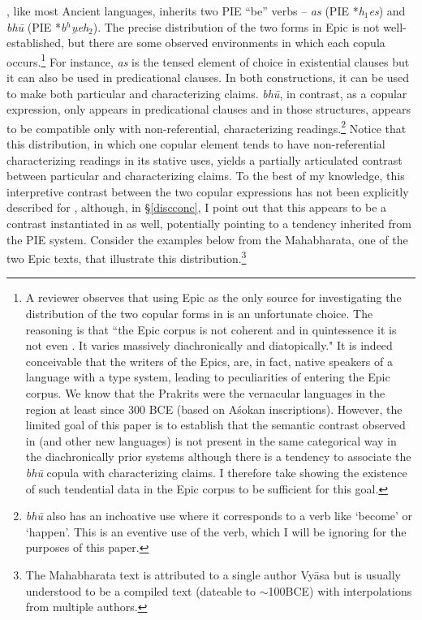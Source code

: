 \documentclass[output=paper,hidelinks]{langscibook}
\begin{document}
\begin{exe}
\begin{xlist}
\begin{xlist}
\begin{exe}
\begin{exe}
\begin{exe}
, like most Ancient  languages, inherits two PIE ``be'' verbs -- \emph{as} (PIE *\emph{h$_1$es}) and \emph{bh\={u}} (PIE *\emph{b$^{h}$u̯eh$_2$}). The precise distribution of the two forms in Epic  is not well-established, but there are some observed environments in which each copula occurs.\footnote{A reviewer observes that using Epic  as the only source for investigating the distribution of the two copular forms in  is an unfortunate choice. The reasoning is that ``the Epic
 corpus is not coherent and in quintessence it is not even . It varies
massively diachronically and diatopically." It is indeed conceivable that the writers of the  Epics, are, in fact, native speakers of a language with a  type system, leading to peculiarities of  entering the Epic corpus. We know that the  Prakrits were the vernacular languages in the region at least since 300 BCE (based on A\'{s}okan inscriptions). However, the limited goal of this paper is to establish that the semantic contrast observed in  (and other new  languages) is not present in the same categorical way in the diachronically prior systems although there is a tendency to associate the \emph{bh\={u}} copula with characterizing claims. I therefore take showing the existence of such tendential data in the Epic corpus to be sufficient for this goal.} For instance, \textit{as} is the tensed element of choice in existential clauses but it can also be used in predicational clauses. In both constructions, it can be used to make both particular and characterizing claims. \emph{bh\={u}}, in contrast, as a copular expression, only appears in predicational clauses and in those structures, appears to be compatible only with non-referential, characterizing readings.\footnote{\emph{bh\={u}} also has an inchoative use where it corresponds to a verb like `become' or `happen'. This is an eventive use of the verb, which I will be ignoring for the purposes of this paper.} Notice that this distribution, in which one copular element tends to have non-referential characterizing readings in its stative uses, yields a partially articulated contrast between particular and characterizing claims. To the best of my knowledge, this interpretive contrast between the two copular expressions has not been explicitly described for , although, in \S\ref{discconc}, I point out that this appears to be a contrast instantiated in  as well, potentially pointing to a tendency inherited from the PIE system.
Consider the examples below from the Mahabharata, one of the two Epic  texts, that illustrate this distribution.\footnote{The Mahabharata text is attributed to a single author Vyāsa but is usually understood to be a compiled text (dateable to $\sim$100BCE) with interpolations from multiple authors.}


\end{exe}
\end{exe}
\end{exe}
\end{xlist}
\end{xlist}
\end{exe}
\end{document}
